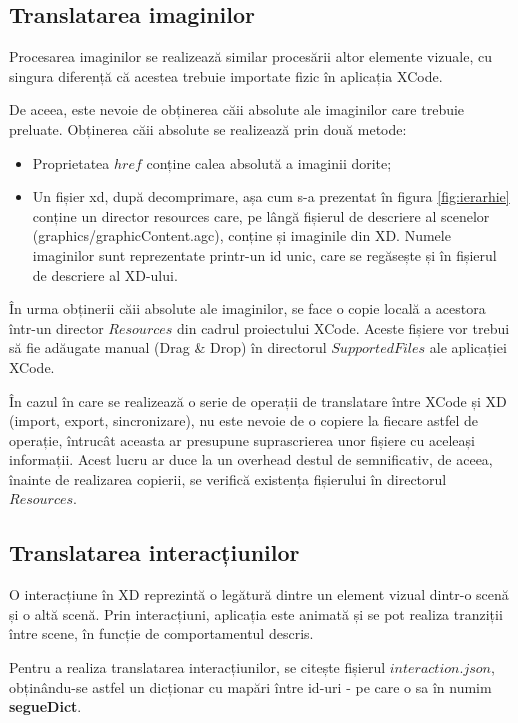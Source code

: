 \subsection{Translatarea imaginilor}

Procesarea imaginilor se realizează similar procesării altor elemente vizuale, cu singura diferență că acestea trebuie importate fizic în aplicația XCode.

De aceea, este nevoie de obținerea căii absolute ale imaginilor care trebuie preluate. 
Obținerea căii absolute se realizează prin două metode:

\begin{itemize}  
\item Proprietatea $href$ conține calea absolută a imaginii dorite;
\item Un fișier xd, după decomprimare, așa cum s-a prezentat în figura \ref{fig:ierarhie} conține un director resources care, pe lângă fișierul de descriere al scenelor (graphics/graphicContent.agc), conține și imaginile din XD. Numele imaginilor sunt reprezentate printr-un id unic, care se regăsește și în fișierul de descriere al XD-ului.
\end{itemize}

În urma obținerii căii absolute ale imaginilor, se face o copie locală a acestora într-un director $Resources$ din cadrul proiectului XCode. Aceste fișiere vor trebui să fie adăugate manual (Drag & Drop) în directorul $Supported Files$ ale aplicației XCode.

În cazul în care se realizează o serie de operații de translatare între XCode și XD (import, export, sincronizare), nu este nevoie de o copiere la fiecare astfel de operație, întrucât aceasta ar presupune suprascrierea unor fișiere cu aceleași informații. Acest lucru ar duce la un overhead destul de semnificativ, de aceea, înainte de realizarea copierii, se verifică existența fișierului în directorul $Resources$.

\subsection{Translatarea interacțiunilor}

O interacțiune în XD reprezintă o legătură dintre un element vizual dintr-o scenă și o altă scenă. Prin interacțiuni, aplicația este animată și se pot realiza tranziții între scene, în funcție de comportamentul descris. 

Pentru a realiza translatarea interacțiunilor, se citește fișierul $interaction.json$, obținându-se astfel un dicționar cu mapări între id-uri - pe care o sa în numim \textbf{segueDict}. 

